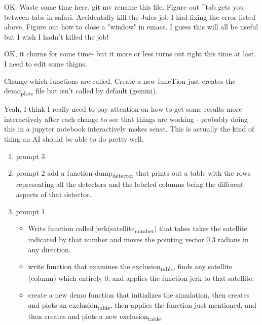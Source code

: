 \documentclass[11pt]{article}
\begin{document}
OK. Waste some time here. git mv rename this file. Figure out \^{}tab gets you
between tabs in safari.  Accidentally kill the Jules job I had fixing
the error listed above. Figure out how to close a "window" in emacs.
I guess this will all be useful but I wish I hadn't killed the job!

OK, it churns for some time- but it more or less turns out right this
time at last.  I need to edit some thigns.

Change which functions are called. Create a new funcTion just
creates the demo\textsubscript{plots} file but isn't called by default (gemini).

Yeah, I think I really need to pay attention on how to get some
results more interactively after each change to see that things
are working - probably doing this in a jupyter notebook interactively
makes sense.  This is actually the kind of thing an AI should be able
to do pretty well.



\begin{enumerate}
\item prompt 3
\label{sec:org22c59ef}



\item prompt 2
\label{sec:org0c3df0c}
add a function dump\textsubscript{detector} that prints out a table with the rows
representing all the detectors and the labeled columns being the different
aspects of that detector.




\item prompt 1
\label{sec:orgd6fec4b}
\begin{itemize}
\item Write function called jerk(satellite\textsubscript{number}) that takes takes the satellite
indicated by that number and moves the pointing vector 0.3 radians in
any direction.
\item write  function that examines the exclusion\textsubscript{table}, finds any satellite
(column) which entirely 0, and applies the function jerk to that satellite.
\item create a new demo function that initializes the simulation,
then creates and plots an exclusion\textsubscript{table}, then applies the function
just mentioned, and then creates and plots a new exclusion\textsubscript{table}.
\end{itemize}
\end{enumerate}
\end{document}
